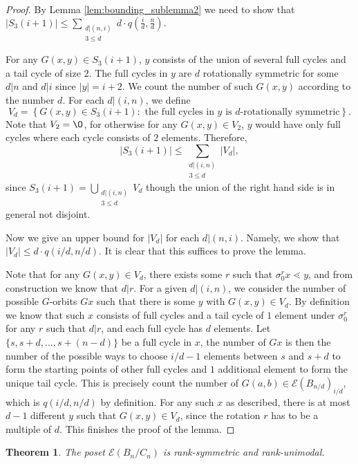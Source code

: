 \documentclass[10 pt]{amsart}
\theoremstyle{plain}
\newtheorem{thm}{Theorem}[section]
\theoremstyle{definition}
\theoremstyle{remark}
\numberwithin{equation}{section}
\begin{document}
\begin{proof} 


By Lemma \ref{lem:bounding_sublemma2} we need to show that $\displaystyle |S_3(i+1)| \le \sum_{\substack{d | (n , i) \\ 3 \le d }} d \cdot q \left(\frac{i}{d},\frac{n}{d}\right)  .$ 


For any $G(x, y) \in S_3(i+1)$, $y$ consists of the union of several full cycles and a tail cycle of size $2$. The full cycles in $y$ are $d$ rotationally symmetric for some $d | n$ and $d | i$ since $|y| = i+2$. We count the number of such $G(x,y)$ according to the number $d$. For each $d| (i, n)$, we define $$V_d = \left\{G(x, y) \in S_3(i+1) : \text{ the full cycles in $y$ is $d$-rotationally symmetric} \right\}.$$ Note that $V_2 = \O$, for otherwise for any $G(x, y) \in V_2$, $y$ would have only full cycles where each cycle consists of $2$ elements. Therefore, $$|S_3(i+1)| \le \displaystyle \sum_{\substack{d| (i, n) \\ 3 \le d}} |V_d|,$$ since $S_3(i+1) = \bigcup_{\substack{d| (i, n) \\ 3 \le d}} V_d$ though the union of the right hand side is in general not disjoint. 

Now we give an upper bound for $|V_d|$ for each $d | (n, i)$. Namely, we show that $|V_d| \le d \cdot q (i/d, n/d)$. It is clear that this suffices to prove the lemma.

Note that for any $G(x, y) \in V_d$, there exists some $r$ such that $\sigma_0^r x \lessdot y$, and from construction we know that $d | r$. For a given $d | (i, n)$, we consider the number of possible $G$-orbits $Gx$ such that there is some $y$ with $G(x, y) \in V_d$. By definition we know that such $x$ consists of full cycles and a tail cycle of $1$ element under $\sigma_0^r$ for any $r$ such that $d |r$, and each full cycle has $d$ elements. Let $\{s, s+d, ..., s+(n-d)\}$ be a full cycle in $x$, the number of $Gx$ is then the number of the possible ways to choose $i/d -1$ elements between $s$ and $s+d$ to form the starting points of other full cycles and $1$ additional element to form the unique tail cycle. This is precisely count the number of $G(a,b) \in \mathcal E (B_{n/d})_{i/d}$, which is $q(i/d, n/d)$ by definition. For any such $x$ as described, there is at most $d-1$ different $y$ such that $G(x,y) \in V_d$, since the rotation $r$ has to be a multiple of $d$. This finishes the proof of the lemma.
\end{proof}


\begin{thm}{\label{cor:cyclic_unimodal}} 
The poset $\mathcal E(B_n/C_n)$ is rank-symmetric and rank-unimodal.
\end{thm}
\end{document}
